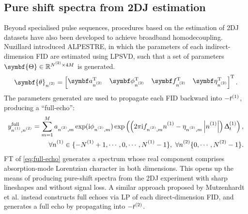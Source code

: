 \subsection{Pure shift spectra from 2DJ estimation}

Beyond specialised pulse sequences, procedures based on the estimation of
\ac{2DJ} datasets have also been developed to achieve broadband homodecoupling.
Nuzillard introduced \ac{ALPESTRE}\cite{Nuzillard1996,Martinez2012}, in which
the parameters of each indirect-dimension FID are estimated using \ac{LPSVD},
such that a set of parameters $\symbf{\Theta} \in \mathbb{R}^{\Ntwo
\times 4M}$ is generated.
\begin{equation}
    \symbf{\theta}_{\ntwo} =
    \begin{bmatrix}
        \bda_{\ntwo}\T &
        \bdphi_{\ntwo}\T &
        \bdf_{\ntwo}\T &
        \bdeta_{\ntwo}\T
    \end{bmatrix}\T.
\end{equation}
The parameters generated are used to propagate each FID backward into
$-t^{(1)}$, producing a ``full-echo'':
\begin{equation}
    \begin{split}
        y^{\text{full}}_{\none,\ntwo} = \sum_{m=1}^{M}
            a_{\ntwo,m}
            \exp(\iu \phi_{\ntwo,m})
            \exp\left(\left(2 \pi \iu f_{\ntwo,m} \none
            -\eta_{\ntwo,m}  \left\lvert \none \right\rvert \right)\Dtone\right), \\
        \forall \none \in \lbrace -\None + 1, \cdots, 0, \cdots, \None - 1 \rbrace,\ \forall \ntwo \lbrace 0, \cdots, \Ntwo - 1 \rbrace.
    \end{split}
    \label{eq:full-echo}
\end{equation}
\ac{FT} of \cref{eq:full-echo} generates a spectrum whose real component
comprises absorption-mode
Lorentzian character in both dimensions. This opens up the means of producing
pure-shift spectra from the \ac{2DJ} experiment with sharp lineshapes and
without signal loss. A similar approach proposed by Mutzenhardt et al.
instead constructs full echoes via \ac{LP} of each direct-dimension
\ac{FID}, and generates a full echo by propagating into
$-t^{(2)}$\cite{Mutzenhardt1999}.


